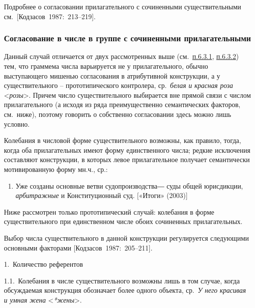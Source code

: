 Подробнее о согласовании прилагательного с сочиненными существительными
см.~{[}Кодзасов~1987:~213--219{]}.

\subsubsection{Согласование в числе в группе с сочиненными
  прилагательными}\label{ux441ux43eux433ux43bux430ux441ux43eux432ux430ux43dux438ux435-ux432-ux447ux438ux441ux43bux435-ux432-ux433ux440ux443ux43fux43fux435-ux441-ux441ux43eux447ux438ux43dux435ux43dux43dux44bux43cux438-ux43fux440ux438ux43bux430ux433ux430ux442ux435ux43bux44cux43dux44bux43cux438}

Данный случай отличается от двух рассмотренных выше
(см.~\underline{п.6.3.1}, \underline{п.6.3.2}) тем, что граммема числа
варьируется не у прилагательного, обычно выступающего мишенью
согласования в атрибутивной конструкции, а у существительного --
прототипического контролера, ср.~\textit{белая и красная роза}
\textless{}\textit{розы}\textgreater. Причем число существительного
выбирается вне прямой связи с числом прилагательного (а исходя из ряда
преимущественно семантических факторов, см.~ниже), поэтому говорить о
собственно согласовании здесь можно лишь условно.

Колебания в числовой форме существительного возможны, как правило,
тогда, когда оба прилагательных имеют форму единственного числа; редкие
исключения составляют конструкции, в которых левое прилагательное
получает семантически мотивированную форму мн.ч., ср.:

\begin{enumerate}
  \def\labelenumi{(\arabic{enumi})}
  \setcounter{enumi}{142}
  \item
        Уже созданы основные ветви судопроизводства― суды общей юрисдикции,
        \textit{арбитражные} и Конституционный суд. {[}«Итоги» (2003){]}
\end{enumerate}

Ниже рассмотрен только прототипический случай: колебания в форме
существительного при единственном числе обоих сочиненных прилагательных.

Выбор числа существительного в данной конструкции регулируется
следующими основными факторами {[}Кодзасов~1987:~205--211{]}.

1.~Количество референтов

1.1.~Колебания в числе существительного возможны лишь в том случае,
когда обсуждаемая конструкция обозначает более одного объекта,
ср.~\textit{У него} \textit{красивая и умная жена}
\textless{}\textit{*жены}\textgreater.


